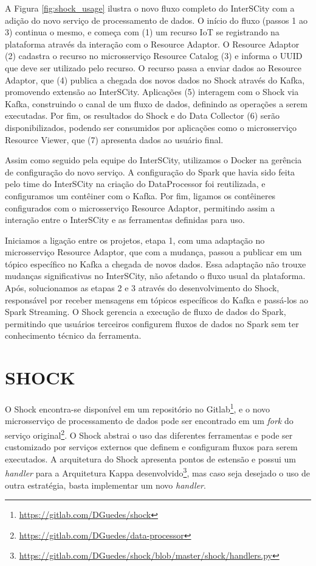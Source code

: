 A Figura \ref{fig:shock_usage} ilustra o novo fluxo completo do InterSCity com a
adição do novo serviço de processamento de dados. O início do fluxo (passos 1 ao
3) continua o mesmo, e começa com (1) um recurso IoT se registrando na plataforma
através da interação com o Resource Adaptor. O Resource Adaptor (2) cadastra o
recurso no microsserviço Resource Catalog (3) e informa o UUID que deve ser
utilizado pelo recurso. O recurso passa a enviar dados ao Resource Adaptor, que
(4) publica a chegada dos novos dados no Shock através do Kafka, promovendo
extensão ao InterSCity.  Aplicações (5) interagem com o Shock via Kafka,
construindo o canal de um fluxo de dados, definindo as operações a
serem executadas.  Por fim, os resultados do Shock e do Data Collector (6)
serão disponibilizados, podendo ser consumidos por aplicações como o
microsserviço Resource Viewer, que (7) apresenta dados ao usuário final.

Assim como seguido pela equipe do InterSCity, utilizamos o Docker na gerência de
configuração do novo serviço. A configuração do Spark que havia sido feita pelo
time do InterSCity na criação do DataProcessor foi reutilizada, e configuramos
um contêiner com o Kafka. Por fim, ligamos os contêineres configurados com o
microsserviço Resource Adaptor, permitindo assim a interação entre o InterSCity
e as ferramentas definidas para uso.

Iniciamos a ligação entre os projetos, etapa 1, com uma adaptação no
microsserviço Resource Adaptor, que com a mudança, passou a publicar em um tópico
específico no Kafka a chegada de novos dados. Essa adaptação não trouxe mudanças
significativas no InterSCity, não afetando o fluxo usual da plataforma.
Após, solucionamos as etapas 2 e 3 através do desenvolvimento do Shock,
responsável por receber mensagens em tópicos específicos do Kafka e passá-los
ao Spark Streaming. O Shock gerencia a execução de fluxo de dados do Spark,
permitindo que usuários terceiros configurem fluxos de dados no Spark sem ter
conhecimento técnico da ferramenta.

\section{SHOCK}

O Shock encontra-se disponível em um repositório no
Gitlab\footnote{\url{https://gitlab.com/DGuedes/shock}}, e o novo microsserviço
de processamento de dados pode ser encontrado em um \textit{fork} do serviço
original\footnote{\url{https://gitlab.com/DGuedes/data-processor}}. O Shock
abstrai o uso das diferentes ferramentas e pode ser customizado
por serviços externos que definem e configuram fluxos para serem
executados. A arquitetura do Shock apresenta pontos de estensão e possui
um \textit{handler} para a Arquitetura Kappa
desenvolvido\footnote{\url{https://gitlab.com/DGuedes/shock/blob/master/shock/handlers.py}},
mas caso seja desejado o uso de outra estratégia, basta implementar um novo
\textit{handler}.

